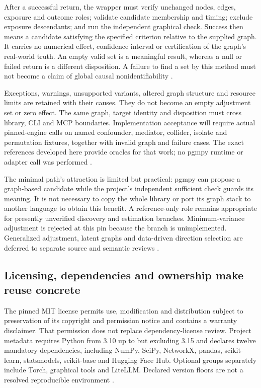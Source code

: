 After a successful return, the wrapper must verify unchanged nodes, edges,
exposure and outcome roles; validate candidate membership and timing;
exclude exposure descendants; and run the independent graphical check.
Success then means a candidate satisfying the specified criterion relative
to the supplied graph. It carries no numerical effect, confidence interval
or certification of the graph's real-world truth. An empty valid set is
a meaningful result, whereas a null or failed return is a different
disposition. A failure to find a set by this method must not become a
claim of global causal nonidentifiability
\citep{exec13_pgmpy_reuse_oracle}.

Exceptions, warnings, unsupported variants, altered graph structure and
resource limits are retained with their causes. They do not become an
empty adjustment set or zero effect. The same graph, target identity and
disposition must cross library, CLI and MCP boundaries. Implementation
acceptance will require actual pinned-engine calls on named confounder,
mediator, collider, isolate and permutation fixtures, together with invalid
graph and failure cases. The exact references developed here provide
oracles for that work; no pgmpy runtime or adapter call was performed
\citep{exec13_pgmpy_reuse_oracle}.

The minimal path's attraction is limited but practical: pgmpy can propose
a graph-based candidate while the project's independent sufficient check
guards its meaning. It is not necessary to copy the whole library or
port its graph stack to another language to obtain this benefit. A
reference-only role remains appropriate for presently unverified discovery
and estimation branches. Minimum-variance adjustment is rejected at this
pin because the branch is unimplemented. Generalized adjustment, latent
graphs and data-driven direction selection are deferred to separate
source and semantic reviews \citep{exec13_pgmpy_reuse_primary}.

\subsection{Licensing, dependencies and ownership make reuse concrete}

The pinned MIT license permits use, modification and distribution subject
to preservation of its copyright and permission notice and contains a
warranty disclaimer. That permission does not replace dependency-license
review. Project metadata requires Python from 3.10 up to but excluding
3.15 and declares twelve mandatory dependencies, including NumPy,
SciPy, NetworkX, pandas, scikit-learn, statsmodels, scikit-base and
Hugging Face Hub. Optional groups separately include Torch, graphical
tools and LiteLLM. Declared version floors are not a resolved reproducible
environment \citep{exec13_pgmpy_reuse_primary}.

